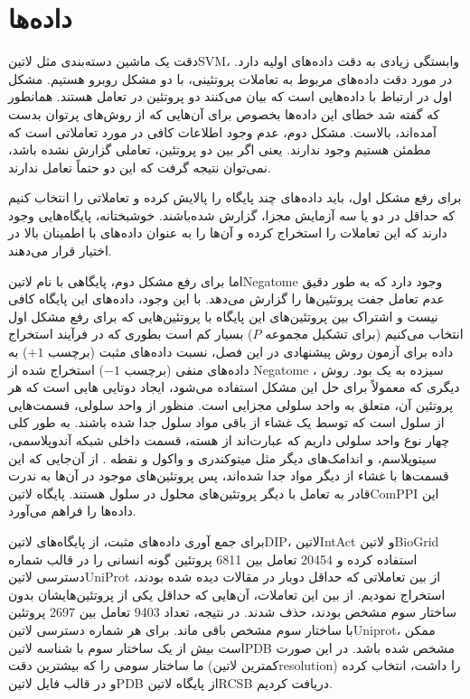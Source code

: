 \section{داده‌ها}
دقت یک ماشین دسته‌بندی مثل ‌لاتین{SVM}، وابستگی زیادی به دقت داده‌های اولیه دارد. در مورد دقت داده‌های مربوط به تعاملات پروتئینی، با دو مشکل روبرو هستیم. مشکل اول در ارتباط با داده‌هایی است که بیان می‌کنند دو پروتئین در تعامل هستند. همانطور که گفته شد خطای این داده‌ها بخصوص برای آن‌هایی که از روش‌های پرتوان بدست آمده‌اند، بالاست. مشکل دوم، عدم وجود اطلاعات کافی در مورد تعاملاتی است که مطمئن هستیم وجود ندارند. یعنی اگر بین دو پروتئین، تعاملی گزارش نشده باشد، نمی‌توان نتیجه گرفت که این دو حتماً تعامل ندارند.

برای رفع مشکل اول، باید داده‌های چند پایگاه را پالایش کرده و تعاملاتی را انتخاب کنیم که حداقل در دو یا سه آزمایش مجزا، گزارش شده‌باشند. خوشبختانه، پایگاه‌هایی وجود دارند که این تعاملات را استخراج کرده و آن‌ها را به عنوان داده‌های با اطمینان بالا در اختیار قرار می‌دهند.

اما برای رفع مشکل دوم، پایگاهی با نام ‌لاتین{Negatome} وجود دارد که به طور دقیق عدم تعامل جفت پروتئین‌ها را گزارش می‌دهد. با این وجود، داده‌های این پایگاه کافی نیست و اشتراک بین پروتئین‌های این پایگاه با پروتئین‌هایی که برای رفع مشکل اول انتخاب می‌کنیم (برای تشکیل مجموعه $P$) بسیار کم است بطوری که در فرآیند استخراج داده برای آزمون روش پیشنهادی در این فصل، نسبت داده‌های مثبت (برچسب $+1$) به داده‌های منفی (برچسب $-1$) استخراج شده از Negatome ، سیزده به یک بود. روش دیگری که معمولاً برای حل این مشکل استفاده می‌شود، ایجاد دوتایی هایی است که هر پروتئین آن، متعلق به واحد سلولی مجزایی است. منظور از واحد سلولی، قسمت‌هایی از سلول است که توسط یک غشاء از باقی مواد سلول جدا شده باشند. به طور کلی چهار نوع واحد سلولی داریم که عبارت‌اند از هسته، قسمت داخلی شبکه آندوپلاسمی، سیتوپلاسم، و اندامک‌های دیگر مثل میتوکندری و واکول و ‌نقطه . از آن‌جایی که این قسمت‌ها با غشاء از دیگر مواد جدا شده‌اند، پس پروتئین‌های موجود در آن‌ها به ندرت قادر به تعامل با دیگر پروتئین‌های محلول در سلول هستند. پایگاه ‌لاتین{ComPPI} این داده‌ها را فراهم می‌آورد.

برای جمع آوری داده‌های مثبت، از پایگاه‌های ‌لاتین{DIP}، ‌لاتین{IntAct} و ‌لاتین{BioGrid} استفاده کرده و 20454 تعامل بین 6811 پروتئین گونه انسانی را در قالب شماره دسترسی ‌لاتین{UniProt} از بین تعاملاتی که حداقل دوبار در مقالات دیده شده بودند، استخراج نمودیم. از بین این تعاملات، آن‌هایی که حداقل یکی از پروتئین‌هایشان بدون ساختار سوم مشخص بودند، حذف شدند. در نتیجه، تعداد 9403 تعامل بین 2697 پروتئین با ساختار سوم مشخص باقی ماند. برای هر شماره دسترسی ‌لاتین{Uniprot}، ممکن است بیش از یک ساختار سوم با شناسه ‌لاتین{PDB} مشخص شده باشد. در این صورت ما ساختار سومی را که بیشترین دقت (کمترین ‌لاتین{resolution}) را داشت، انتخاب کرده و در قالب فایل ‌لاتین{PDB} از پایگاه ‌لاتین{RCSB} دریافت کردیم.

